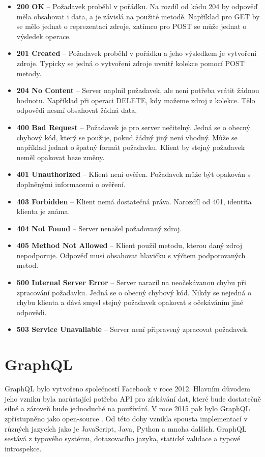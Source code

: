\documentclass[thesis=M,czech]{FITthesis}[2019/12/23]
\begin{document}
\begin{itemize}
    \item \textbf{200 OK} -- Požadavek proběhl v pořádku. Na rozdíl od kódu 204 by odpověď měla obsahovat i data, a je závislá na použité metodě. Například pro GET by se mělo jednat o reprezentaci zdroje, zatímco pro POST se může jednat o výsledek operace.
    \item \textbf{201 Created} -- Požadavek proběhl v pořádku a jeho výsledkem je vytvoření zdroje. Typicky se jedná o vytvoření zdroje uvnitř kolekce pomocí POST metody.
    \item \textbf{204 No Content} -- Server naplnil požadavek, ale není potřeba vrátit žádnou hodnotu. Například při operaci DELETE, kdy mažeme zdroj z kolekce. Tělo odpovědi nesmí obsahovat žádná data.
    \item \textbf{400 Bad Request} -- Požadavek je pro server nečitelný. Jedná se o obecný chybový kód, který se použije, pokud žádný jiný není vhodný. Může se například jednat o špatný formát požadavku. Klient by stejný požadavek neměl opakovat beze změny.
    \item \textbf{401 Unauthorized} -- Klient není ověřen. Požadavek může být opakován s doplněnými informacemi o ověření.
    \item \textbf{403 Forbidden} -- Klient nemá dostatečná práva. Narozdíl od 401, identita klienta je známa.
    \item \textbf{404 Not Found} -- Server nenašel požadovaný zdroj.
    \item \textbf{405 Method Not Allowed} -- Klient použil metodu, kterou daný zdroj nepodporuje. Odpověď musí obsahovat hlavičku s výčtem podporovaných metod.
    \item \textbf{500 Internal Server Error} -- Server narazil na neočekávanou chybu při zpracování požadavku. Jedná se o obecný chybový kód. Nikdy se nejedná o chybu klienta a dává smysl stejný požadavek opakovat s očekáváním jiné odpovědi.
    \item \textbf{503 Service Unavailable} -- Server není připravený zpracovat požadavek.
\end{itemize}

\section{GraphQL}
GraphQL bylo vytvořeno společností Facebook v roce 2012. Hlavním důvodem jeho vzniku byla narůstající potřeba API pro získávání dat, které bude dostatečně silné a zároveň bude jednoduché na používání. V roce 2015 pak bylo GraphQL zpřístupněno jako open-source \cite{graphql_fb}. Od této doby vznikla spousta implementací v různých jazycích jako je JavaScript, Java, Python a mnoha dalších. GraphQL sestává z typového systému, dotazovacího jazyka, statické validace a typové introspekce.
\end{document}

